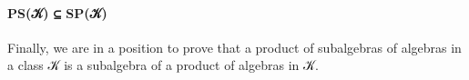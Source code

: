 \paragraph{PS(𝒦) ⊆ SP(𝒦)}\label{psux1d4a6-spux1d4a6}

Finally, we are in a position to prove that a product of subalgebras of
algebras in a class 𝒦 is a subalgebra of a product of algebras in 𝒦.

\begin{code}%
\>[0]\<%
\\
\>[0]\AgdaSpace{}%
\AgdaModule{\AgdaUnderscore{}}\AgdaSpace{}%
\AgdaSymbol{\{}\AgdaSpace{}%
\AgdaSymbol{:}\AgdaSpace{}%
\AgdaSymbol{\}\{}\AgdaSpace{}%
\AgdaSymbol{:}\AgdaSpace{}%
\AgdaSpace{}%
\AgdaSymbol{(}\AgdaSpace{}%
\AgdaSpace{}%
\AgdaSymbol{)(}\AgdaSpace{}%
\AgdaSymbol{)\}}\AgdaSpace{}%
\AgdaSymbol{\{}\AgdaSpace{}%
\AgdaSymbol{:}\AgdaSpace{}%
\AgdaSpace{}%
\AgdaSymbol{(}\AgdaSpace{}%
\AgdaSymbol{)(}\AgdaSpace{}%
\AgdaSymbol{)\}}\AgdaSpace{}%
\<%
\\
%
\\[\AgdaEmptyExtraSkip]%
\>[0][@{}l@{\AgdaIndent{0}}]%
\>[1]\AgdaSpace{}%
\AgdaSymbol{:}\AgdaSpace{}%
\<%
\\
%
\>[1]\AgdaSpace{}%
\AgdaSymbol{=}\AgdaSpace{}%
\AgdaSpace{}%
\<%
\\
%
\\[\AgdaEmptyExtraSkip]%
%
\>[1]\AgdaSpace{}%
\AgdaSymbol{:}\AgdaSpace{}%
\AgdaSymbol{(}\AgdaSymbol{\{}\AgdaSymbol{\}\{}\AgdaSymbol{\}}\AgdaSpace{}%
\AgdaSymbol{(}\AgdaSymbol{\{}\AgdaSymbol{\}\{}\AgdaSymbol{\}}\AgdaSpace{}%
\AgdaSymbol{))}\AgdaSpace{}%
\AgdaSpace{}%
\AgdaSymbol{(}\AgdaSymbol{\{}\AgdaSymbol{\}\{}\AgdaSymbol{\}}\AgdaSpace{}%
\AgdaSymbol{(}\AgdaSymbol{\{}\AgdaSymbol{\}\{}\AgdaSymbol{\}}\AgdaSpace{}%
\AgdaSymbol{))}\<%
\\
%
\>[1]\AgdaSpace{}%
\AgdaSymbol{(}\AgdaSpace{}%
\AgdaSymbol{(}\AgdaSpace{}%

\end{code}
